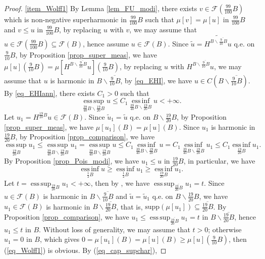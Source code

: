 \documentclass[11pt,a4paper]{article}
\numberwithin{equation}{section}
\newcommand{\esup}{\operatorname*{ess\,sup}}
\newcommand{\einf}{\operatorname*{ess\,inf}}
\theoremstyle{plain}
\theoremstyle{definition}
\begin{document}
\begin{proof}
\ref{item_Wolff1} By Lemma \ref{lem_FU_modi}, there exists $v\in\mathcal{F}(\frac{99}{100}B)$ which is non-negative superharmonic in $\frac{99}{100}B$ such that $\mu[v]=\mu[u]$ in $\frac{99}{100}B$ and $v\le u$ in $\frac{99}{100}B$, by replacing $u$ with $v$, we may assume that $u\in\mathcal{F}(\frac{99}{100}B)\subseteq \mathcal{F}(B)$, hence assume $u\in \mathcal{F}(B)$. Since $\widetilde{u}=\widetilde{H^{B\backslash\overline{\frac{9}{10}B}}u}$ q.e. on $\frac{9}{10}B$, by Proposition \ref{prop_super_meas}, we have $\mu[u](\frac{9}{10}B)=\mu[H^{B\backslash\overline{\frac{9}{10}B}}u](\frac{9}{10}B)$, by replacing $u$ with $H^{B\backslash\overline{\frac{9}{10}B}}u$, we may assume that $u$ is harmonic in $B\backslash\overline{\frac{9}{10}B}$, by \ref{eq_EHI}, we have $u\in C(B\backslash \overline{\frac{9}{10}B})$. By \ref{eq_EHIann}, there exists $C_1>0$ such that
$$\esup_{\frac{39}{40}B\backslash {\frac{19}{20}B}}u\le C_1\einf_{\frac{39}{40}B\backslash{\frac{19}{20}B}}u<+\infty.$$
Let $u_1=H^{\frac{19}{20}B}u\in\mathcal{F}(B)$. Since $\widetilde{u}_1=\widetilde{u}$ q.e. on $B\backslash {\frac{19}{20}B}$, by Proposition \ref{prop_super_meas}, we have $\mu[u_1](B)=\mu[u](B)$. Since $u_1$ is harmonic in $\frac{19}{20}B$, by Proposition \ref{prop_comparison}, we have
$$\esup_{\frac{19}{20}B}u_1\le\esup_{\frac{39}{40}B\backslash \frac{19}{20}B}u_1=\esup_{\frac{39}{40}B\backslash \frac{19}{20}B}u\le C_1\einf_{\frac{39}{40}B\backslash \frac{19}{20}B}u=C_1\einf_{\frac{39}{40}B\backslash \frac{19}{20}B}u_1\le C_1\einf_{\frac{19}{20}B}u_1.$$
By Proposition \ref{prop_Pois_modi}, we have $u_1\le u$ in $\frac{19}{20}B$, in particular, we have
$$\einf_{\frac{1}{2}B}u\ge\einf_{\frac{1}{2}B}u_1\ge\einf_{{\frac{19}{20}B}}u_1.$$
Let $t=\esup_{\frac{19}{20}B}u_1<+\infty$, then by \hyperlink{eq_LSC}{}, we have $\esup_{\overline{\frac{19}{20}B}}u_1=t$. Since $u\in\mathcal{F}(B)$ is harmonic in $B\backslash\overline{\frac{9}{10}B}$ and $\widetilde{u}=\widetilde{u}_1$ q.e. on $B\backslash \frac{19}{20}B$, we have $u_1\in \mathcal{F}(B)$ is harmonic in $B\backslash \overline{\frac{19}{20}B}$, that is, $\mathrm{supp}(\mu[u_1])\subseteq \overline{\frac{19}{20}B}$. By Proposition \ref{prop_comparison}, we have $u_1\le\esup_{\overline{\frac{19}{20}B}}u_1=t$ in $B\backslash \overline{\frac{19}{20}B}$, hence $u_1\le t$ in $B$. Without loss of generality, we may assume that $t>0$; otherwise $u_1=0$ in $B$, which gives $0=\mu[u_1](B)=\mu[u](B)\ge \mu[u](\frac{9}{10}B)$, then (\ref{eq_Wolff1}) is obvious. By (\ref{eq_cap_supchar}),

\end{proof}
\end{document}
